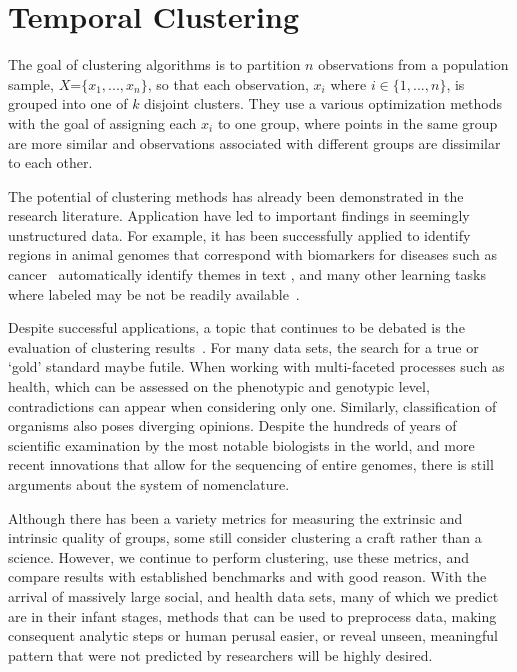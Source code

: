\chapter{Temporal Clustering}
\label{sec:clustering}
The goal of clustering algorithms is to partition $n$ observations from a population sample, $X$=$\{x_{1}, . . . , x_{n}\}$, so that each observation, $x_{i}$ where $i \in \{1,...,n\}$, is grouped into one of $k$ disjoint clusters.  They use a various optimization methods with the goal of assigning each $x_{i}$ to one group, where points in the same group are more similar and observations associated with different groups are dissimilar to each other.

The potential of clustering methods has already been demonstrated in the research literature.  Application have led to important findings in seemingly unstructured data.  For example, it has been successfully applied to identify regions in animal genomes that correspond with biomarkers for diseases such as cancer~\cite{Srivastava,Ewald} automatically identify themes in text \cite{Wang2012}, and many other learning tasks where labeled may be not be readily available~\cite{post08,XinSohJor2006}.

Despite successful applications, a topic that continues to be debated is the evaluation of clustering results~\cite{Guyon09}.  For many data sets, the search for a true or `gold' standard maybe futile.  When working with multi-faceted processes such as health, which can be assessed on the phenotypic and genotypic level, contradictions can appear when considering only one.  Similarly, classification of organisms also poses diverging opinions. Despite the hundreds of years of scientific examination by the most notable biologists in the world, and more recent innovations that allow for the sequencing of entire genomes, there is still arguments about the system of nomenclature.

Although there has been a variety metrics for measuring the extrinsic and intrinsic quality of groups, some still consider clustering a craft rather than a science.  However, we continue to perform clustering, use these metrics, and compare results with established benchmarks and with good reason.  With the arrival of massively large social, and health data sets, many of which we predict are in their infant stages, methods that can be used to preprocess data, making consequent analytic steps or human perusal easier, or reveal unseen, meaningful pattern that were not predicted by researchers will be highly desired.

